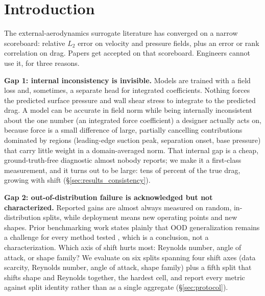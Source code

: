 \maketitle
\raggedbottom

\section{Introduction}
\label{sec:intro}

The external-aerodynamics surrogate literature has converged on a narrow
scoreboard: relative $L_2$ error on velocity and pressure fields, plus an error
or rank correlation on drag. Papers get accepted on that scoreboard. Engineers
cannot use it, for three reasons.

\textbf{Gap 1: internal inconsistency is invisible.} Models are trained with a
field loss and, sometimes, a separate head for integrated coefficients. Nothing
forces the predicted surface pressure and wall shear stress to integrate to the
predicted drag. A model can be accurate in field norm while being internally
inconsistent about the one number (an integrated force coefficient) a designer
actually acts on, because force is a small difference of large, partially
cancelling contributions dominated by regions (leading-edge suction peak,
separation onset, base pressure) that carry little weight in a domain-averaged
norm. That internal gap is a cheap, ground-truth-free diagnostic almost nobody
reports; we make it a first-class measurement, and it turns out to be large:
tens of percent of the true drag, growing with shift
(\S\ref{sec:results_consistency}).

\textbf{Gap 2: out-of-distribution failure is acknowledged but not
characterized.} Reported gains are almost always measured on random,
in-distribution splits, while deployment means new operating points and new
shapes. Prior benchmarking work states plainly that OOD generalization remains
a challenge for every method tested \citep{rabeh2025benchmarking}, which is a
conclusion, not a characterization. Which axis of shift hurts most: Reynolds
number, angle of attack, or shape family? We evaluate on six splits spanning
four shift axes (data scarcity, Reynolds number, angle of attack, shape
family) plus a fifth split that shifts shape and Reynolds together, the hardest
cell, and report every metric against split identity rather than as a single
aggregate (\S\ref{sec:protocol}).

